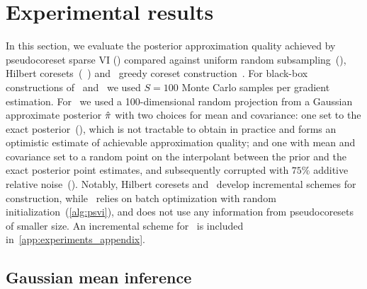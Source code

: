 \section{Experimental results}
\label{sec:experiments}
In this section, we evaluate the posterior approximation quality achieved by
pseudocoreset sparse VI (\psvi) compared against uniform random subsampling~(\uniform), Hilbert
coresets~(\giga~\citep{campbell18}) and \sparsevi~greedy coreset
construction~\citep{campbell19neurips}.  For black-box constructions of \sparsevi~and \psvi~we used $S =
100$ Monte Carlo samples per gradient estimation. For \giga~we used a
100-dimensional random projection from a Gaussian approximate posterior $\hat{\pi}$
with  two choices for mean and covariance: one set to the exact
posterior~(\optimal), which is not tractable to obtain in practice and forms an
optimistic estimate of achievable approximation quality; and one with mean and
covariance set to a random point on the interpolant between the prior and the
exact posterior point estimates, and subsequently corrupted with $75\%$
additive relative noise~(\realistic). Notably, Hilbert coresets and
\sparsevi~develop incremental schemes for construction, while \psvi~relies on
batch optimization with random initialization~(\cref{alg:psvi}), and does not
use any information from pseudocoresets of smaller size. An incremental scheme
for \sparsevi~is included in~\cref{app:experiments_appendix}. %

\subsection{Gaussian mean inference}
\label{section:gaussian_experiment}

